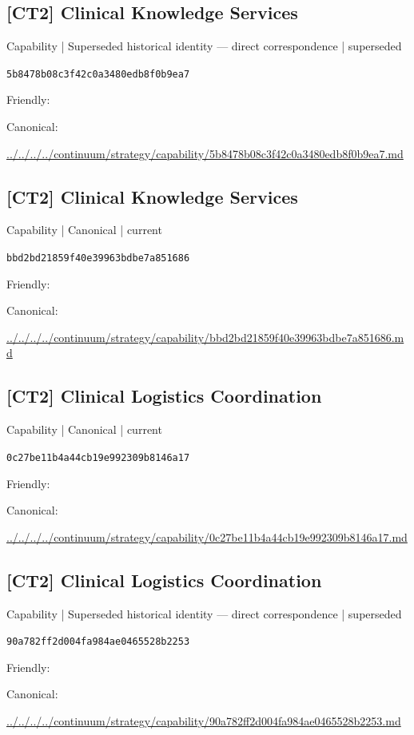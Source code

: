 \documentclass[10pt,a4paper]{article}
\begin{document}
\subsection*{[CT2] Clinical Knowledge Services}
{\small Capability | Superseded historical identity — direct correspondence | superseded}\par
\texttt{5b8478b08c3f42c0a3480edb8f0b9ea7}\par
Friendly: \par
Canonical: \par
{\footnotesize\url{../../../../continuum/strategy/capability/5b8478b08c3f42c0a3480edb8f0b9ea7.md}}\par
\subsection*{[CT2] Clinical Knowledge Services}
{\small Capability | Canonical | current}\par
\texttt{bbd2bd21859f40e39963bdbe7a851686}\par
Friendly: \par
Canonical: \par
{\footnotesize\url{../../../../continuum/strategy/capability/bbd2bd21859f40e39963bdbe7a851686.md}}\par
\subsection*{[CT2] Clinical Logistics Coordination}
{\small Capability | Canonical | current}\par
\texttt{0c27be11b4a44cb19e992309b8146a17}\par
Friendly: \par
Canonical: \par
{\footnotesize\url{../../../../continuum/strategy/capability/0c27be11b4a44cb19e992309b8146a17.md}}\par
\subsection*{[CT2] Clinical Logistics Coordination}
{\small Capability | Superseded historical identity — direct correspondence | superseded}\par
\texttt{90a782ff2d004fa984ae0465528b2253}\par
Friendly: \par
Canonical: \par
{\footnotesize\url{../../../../continuum/strategy/capability/90a782ff2d004fa984ae0465528b2253.md}}\par
\end{document}
